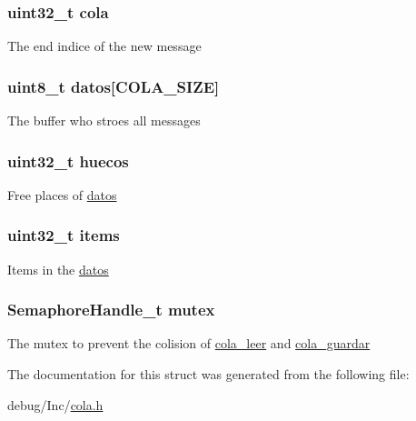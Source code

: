 \subsubsection[{\texorpdfstring{cola}{cola}}]{\setlength{\rightskip}{0pt plus 5cm}uint32\+\_\+t cola}\hypertarget{structt__cola_ae6eec6efa2dd9d70da13b2a435c3de27}{}\label{structt__cola_ae6eec6efa2dd9d70da13b2a435c3de27}
The end indice of the new message 
\subsubsection[{\texorpdfstring{datos}{datos}}]{\setlength{\rightskip}{0pt plus 5cm}uint8\+\_\+t datos\mbox{[}{\bf C\+O\+L\+A\+\_\+\+S\+I\+ZE}\mbox{]}}\hypertarget{structt__cola_a8eaaf6d0a3ebef35b2d6c94e9a63bf3d}{}\label{structt__cola_a8eaaf6d0a3ebef35b2d6c94e9a63bf3d}
The buffer who stroes all messages 
\subsubsection[{\texorpdfstring{huecos}{huecos}}]{\setlength{\rightskip}{0pt plus 5cm}uint32\+\_\+t huecos}\hypertarget{structt__cola_a326c5b8fc3633ed405339faf05e5a552}{}\label{structt__cola_a326c5b8fc3633ed405339faf05e5a552}
Free places of \hyperlink{structt__cola_a8eaaf6d0a3ebef35b2d6c94e9a63bf3d}{datos} 
\subsubsection[{\texorpdfstring{items}{items}}]{\setlength{\rightskip}{0pt plus 5cm}uint32\+\_\+t items}\hypertarget{structt__cola_a3691abaa51fe86a073eaabdd1c39b74c}{}\label{structt__cola_a3691abaa51fe86a073eaabdd1c39b74c}
Items in the \hyperlink{structt__cola_a8eaaf6d0a3ebef35b2d6c94e9a63bf3d}{datos} 
\subsubsection[{\texorpdfstring{mutex}{mutex}}]{\setlength{\rightskip}{0pt plus 5cm}Semaphore\+Handle\+\_\+t mutex}\hypertarget{structt__cola_afc659d089f5608a17e8650e59a7e26fc}{}\label{structt__cola_afc659d089f5608a17e8650e59a7e26fc}
The mutex to prevent the colision of \hyperlink{group___cola___exported___functions___group2_ga12fe948f259d8c9d7a390a76c416b55c}{cola\+\_\+leer} and \hyperlink{group___cola___exported___functions___group2_gaa639dba8be8eec5d19259aeb8de2cd7a}{cola\+\_\+guardar} 

The documentation for this struct was generated from the following file\+:\begin{DoxyCompactItemize}
\item 
debug/\+Inc/\hyperlink{cola_8h}{cola.\+h}\end{DoxyCompactItemize}
